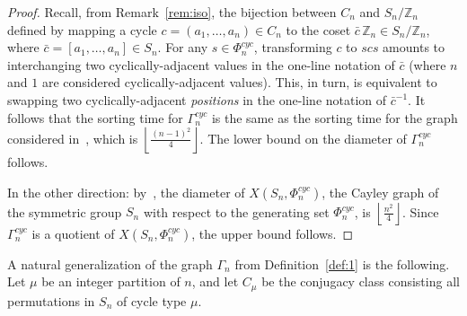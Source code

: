 \documentclass[11pt]{amsart}
\newtheorem{problem}[theorem]{Problem}
\numberwithin{equation}{section}
\newcommand{\todo}[1]{\vspace{5 mm}\par \noindent
\marginpar{\textsc{ToDo}} \framebox{\begin{minipage}[c]{0.95
\textwidth}
 #1 \end{minipage}}\vspace{5 mm}\par}
\newcommand{\ZZ}{{\mathbb {Z}}}
\begin{document}
\begin{proof}
    Recall, from Remark~\ref{rem:iso}, the bijection between $C_n$ and $S_n/\ZZ_n$ defined by mapping a cycle $c =(a_1, \ldots, a_n) \in C_n$ to the coset $\bar{c}\,\ZZ_n \in S_n/\ZZ_n$, where $\bar{c} = [a_1,\ldots,a_n] \in S_n$.
    For any $s \in \Phi^{cyc}_n$, transforming $c$ to $scs$ amounts to interchanging two cyclically-adjacent values in the one-line notation of $\bar{c}$ (where $n$ and $1$ are considered cyclically-adjacent values). This, in turn, is equivalent to swapping two cyclically-adjacent {\em positions} in the one-line notation of $\bar{c}^{-1}$. It follows that the sorting time for $\Gamma^{cyc}_n$ is the same as the sorting time for the graph considered in~\cite{AAR}, which is $\left\lfloor \frac{(n-1)^2}{4} \right\rfloor$. 
    The lower bound on the diameter of $\Gamma^{cyc}_n$ follows.

    In the other direction: by~\cite{ZBSY}, the diameter of $X(S_n,\Phi^{cyc}_n)$, the Cayley graph of the symmetric group $S_n$ with respect to the generating set $\Phi^{cyc}_n$, is 
    $\left\lfloor \frac{n^2}{4} \right\rfloor$. 
    Since %
    $\Gamma^{cyc}_n$ is a quotient of $X(S_n,\Phi^{cyc}_n)$, the upper bound follows. 
\end{proof}






\medskip

A natural generalization of the graph $\Gamma_n$ from Definition~\ref{def:1}  is the following. 
Let $\mu$ be an integer partition of $n$, and let $C_\mu$ be the conjugacy class consisting all permutations in $S_n$ of cycle type $\mu$.  
\end{document}
